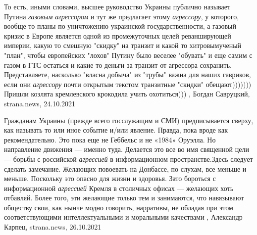 То есть, иными словами, высшее руководство Украины публично называет Путина
\emph{газовым агрессором} и тут же предлагает этому \emph{агрессору}, у которого, вообще то
планы по уничтожению украинской государственности, а газовый кризис в Европе
является одной из промежуточных целей реванширующей империи, какую то смешную
"скидку" на транзит и какой то хитровымученый "план", чтобы европейских "лохов"
Путину было веселее "обувать" и еще самим с газом в ГТС остаться и какие то
деньги за транзит от агрессора сохранить.  Представляете, насколько "власна
добыча" из "трубы" важна для наших гавриков, если они \emph{агрессору} почти открытым
текстом транзитные "скидки" обещают))))))) Пришли козлята кремлевского
крокодила учить охотиться)))
, 
Богдан Савруцкий, strana.news, 24.10.2021

Гражданам Украины (прежде всего госслужащим и СМИ) предписывается сверху, как
называть то или иное событие и/или явление. Правда, пока вроде как
рекомендательно. Это пока еще не Геббельс и не «1984» Оруэлла. Но направление
движения — именно туда.  Делается это все во имя священной цели — борьбы с
российской \emph{агрессией} в информационном пространстве.Здесь следует сделать
замечание. Желающих повоевать на Донбассе, по слухам, все меньше и меньше.
Поскольку это опасно для жизни и здоровья. Зато бороться с информационной
\emph{агрессией} Кремля в столичных офисах — желающих хоть отбавляй. Более
того, эти желающие только тем и занимаются, что навязывают обществу свои, как
нынче модно говорить, нарративы, не обладая при этом соответствующими
интеллектуальными и моральными качествами
, 
Александр Карпец, strana.news, 26.10.2021
